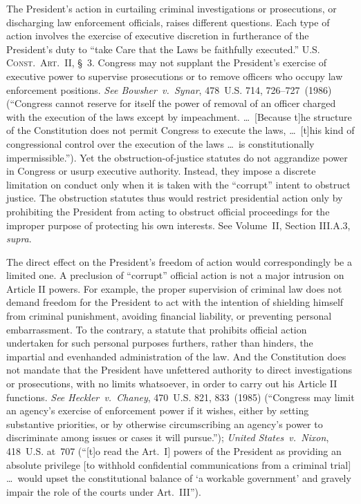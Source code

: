 The President's action in curtailing criminal investigations or prosecutions, or discharging law enforcement officials, raises different questions.
Each type of action involves the exercise of executive discretion in furtherance of the President's duty to ``take Care that the Laws be faithfully executed.''
\textsc{U.S. Const.\ Art.~II}, \S~3.
Congress may not supplant the President's exercise of executive power to supervise prosecutions or to remove officers who occupy law enforcement positions.
\textit{See Bowsher~v.\ Synar}, 478~U.S. 714, 726--727~(1986) (``Congress cannot reserve for itself the power of removal of an officer charged with the execution of the laws except by impeachment. \dots\ [Because t]he structure of the Constitution does not permit Congress to execute the laws, \dots\ [t]his kind of congressional control over the execution of the laws \dots\ is constitutionally impermissible.'').
Yet the obstruction-of-justice statutes do not aggrandize power in Congress or usurp executive authority.
Instead, they impose a discrete limitation on conduct only when it is taken with the ``corrupt'' intent to obstruct justice.
The obstruction statutes thus would restrict presidential action only by prohibiting the President from acting to obstruct official proceedings for the improper purpose of protecting his own interests.
See Volume~II, Section III.A.3, \textit{supra}.

The direct effect on the President's freedom of action would correspondingly be a limited one.
A preclusion of ``corrupt'' official action is not a major intrusion on Article II powers.
For example, the proper supervision of criminal law does not demand freedom for the President to act with the intention of shielding himself from criminal punishment, avoiding financial liability, or preventing personal embarrassment.
To the contrary, a statute that prohibits official action undertaken for such personal purposes furthers, rather than hinders, the impartial and evenhanded administration of the law.
And the Constitution does not mandate that the President have unfettered authority to direct investigations or prosecutions, with no limits whatsoever, in order to carry out his Article II functions.
\textit{See Heckler~v.\ Chaney}, 470~U.S. 821, 833~(1985) (``Congress may limit an agency's exercise of enforcement power if it wishes, either by setting substantive priorities, or by otherwise circumscribing an agency's power to discriminate among issues or cases it will pursue.'');
\textit{United States~v.\ Nixon}, 418~U.S. at~707 (``[t]o read the Art.~I] powers of the President as providing an absolute privilege [to withhold confidential communications from a criminal trial] \dots\ would upset the constitutional balance of `a workable government' and gravely impair the role of the courts under Art.~III'').

